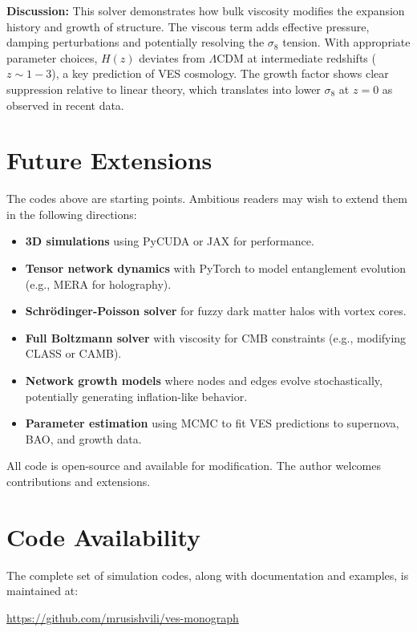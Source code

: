 \documentclass[12pt,a4paper]{book}
\begin{document}
\textbf{Discussion:} This solver demonstrates how bulk viscosity modifies the expansion history and growth of structure. The viscous term adds effective pressure, damping perturbations and potentially resolving the $\sigma_8$ tension. With appropriate parameter choices, $H(z)$ deviates from $\Lambda$CDM at intermediate redshifts ($z \sim 1-3$), a key prediction of VES cosmology. The growth factor shows clear suppression relative to linear theory, which translates into lower $\sigma_8$ at $z=0$ as observed in recent data.

\section{Future Extensions}

The codes above are starting points. Ambitious readers may wish to extend them in the following directions:
\begin{itemize}
    \item \textbf{3D simulations} using PyCUDA or JAX for performance.
    \item \textbf{Tensor network dynamics} with PyTorch to model entanglement evolution (e.g., MERA for holography).
    \item \textbf{Schrödinger-Poisson solver} for fuzzy dark matter halos with vortex cores.
    \item \textbf{Full Boltzmann solver} with viscosity for CMB constraints (e.g., modifying CLASS or CAMB).
    \item \textbf{Network growth models} where nodes and edges evolve stochastically, potentially generating inflation-like behavior.
    \item \textbf{Parameter estimation} using MCMC to fit VES predictions to supernova, BAO, and growth data.
\end{itemize}
All code is open-source and available for modification. The author welcomes contributions and extensions.

\section*{Code Availability}

The complete set of simulation codes, along with documentation and examples, is maintained at:
\begin{center}
\url{https://github.com/mrusishvili/ves-monograph}
\end{center}
\end{document}
